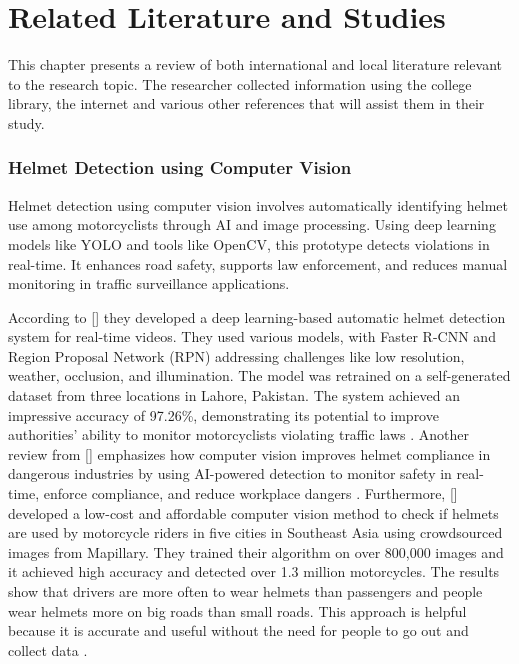 \chapter{Related Literature and Studies}


\begin{refsection}


    This chapter presents a review of both international and local literature relevant to the research topic. The researcher collected information using the college library, the internet and various other references that will assist them in their study.


\subsection{Helmet Detection using Computer Vision}
    Helmet detection using computer vision involves automatically identifying helmet use among motorcyclists through AI and image processing. Using deep learning models like YOLO and tools like OpenCV, this prototype detects violations in real-time. It enhances road safety, supports law enforcement, and reduces manual monitoring in traffic surveillance applications.


According to \citeauthor{afzal2021helmet} [\citeyear{afzal2021helmet}] they developed a deep learning-based automatic helmet detection system for real-time videos. They used various models, with Faster R-CNN and Region Proposal Network (RPN) addressing challenges like low resolution, weather, occlusion, and illumination. The model was retrained on a self-generated dataset from three locations in Lahore, Pakistan. The system achieved an impressive accuracy of 97.26\%, demonstrating its potential to improve authorities' ability to monitor motorcyclists violating traffic laws \cite{afzal2021helmet}. Another review from \citeauthor{singh2024visual} [\citeyear{singh2024visual}] emphasizes how computer vision improves helmet compliance in dangerous industries by using AI-powered detection to monitor safety in real-time, enforce compliance, and reduce workplace dangers \cite{singh2024visual}. Furthermore, \citeauthor{siebert2024urban} [\citeyear{siebert2024urban}] developed a low-cost and affordable computer vision method to check if helmets are used by motorcycle riders in five cities in Southeast Asia using crowdsourced images from Mapillary. They trained their algorithm on over 800,000 images and it achieved high accuracy and detected over 1.3 million motorcycles. The results show that drivers are more often to wear helmets than passengers and people wear helmets more on big roads than small roads. This approach is helpful because it is accurate and useful without the need for people to go out and collect data \cite{siebert2024urban}.



\end{refsection}
